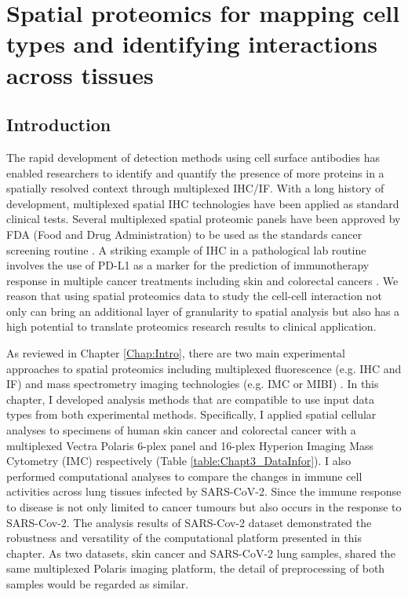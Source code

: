 \chapter[Spatial proteomics for mapping cell types and identifying interactions across tissues]{Spatial proteomics for mapping cell types and identifying interactions across tissues}
\label{Chap:3}	%
\pagestyle{headings}
\section{Introduction }
\label{Sec:3.1_intro}
The rapid development of detection methods using cell surface antibodies has enabled researchers to identify and quantify the presence of more proteins in a spatially resolved context through multiplexed IHC/IF. With a long history of development, multiplexed spatial IHC technologies have been applied as standard clinical tests. Several multiplexed spatial proteomic panels have been approved by FDA (Food and Drug Administration) to be used as the standards cancer screening routine \cite{van2021multiplexed, hawes2009immunohistochemistry,decalf2019new}. A striking example of IHC in a pathological lab routine involves the use of PD-L1 as a marker for the prediction of immunotherapy response in multiple cancer treatments including skin and colorectal cancers \cite{van2021multiplexed}. We reason that using spatial proteomics data to study the cell-cell interaction not only can bring an additional layer of granularity to spatial analysis but also has a high potential to translate proteomics research results to clinical application. 

As reviewed in Chapter \ref{Chap:Intro}, there are two main experimental approaches to spatial proteomics including multiplexed fluorescence (e.g. IHC and IF) and mass spectrometry imaging technologies (e.g. IMC or MIBI) \cite{hoyt2021multiplex, baharlou2019mass} . In this chapter, I developed analysis methods that are compatible to use input data types from both experimental methods. Specifically, I applied spatial cellular analyses to specimens of human skin cancer and colorectal cancer with a multiplexed Vectra Polaris 6-plex panel and 16-plex Hyperion Imaging Mass Cytometry (IMC) respectively (Table \ref{table:Chapt3_DataInfor}). I also performed computational analyses to compare the changes in immune cell activities across lung tissues infected by SARS-CoV-2. Since the immune response to disease is not only limited to cancer tumours but also occurs in the response to SARS-Cov-2. The analysis results of SARS-Cov-2 dataset demonstrated the robustness and versatility of the computational platform presented in this chapter. As two datasets, skin cancer and SARS-CoV-2 lung samples, shared the same multiplexed Polaris imaging platform, the detail of preprocessing of both samples would be regarded as similar. 

